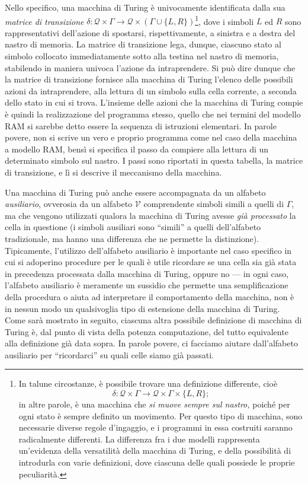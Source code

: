 \documentclass[10pt]{\classname}
\theoremstyle{definition}
\theoremstyle{definition}
\begin{document}
Nello specifico, una macchina di Turing è univocamente identificata dalla sua
\emph{matrice di transizione} $\delta  : \mathcal Q \times \Gamma \rightarrow
\mathcal Q \times (\Gamma \cup \{L,R\})$\footnote{In talune circostanze, è
possibile trovare una definizione differente, cioè $$\delta  : \mathcal Q \times
\Gamma \rightarrow \mathcal Q \times \Gamma \times \{L,R\};$$ in altre parole, è
una macchina che \emph{si muove sempre sul nastro,} poiché per ogni stato è
sempre definito un movimento. Per questo tipo di macchina, sono necessarie
diverse regole d'ingaggio, e i programmi in essa costruiti saranno radicalmente
differenti. La differenza fra i due modelli rappresenta un'evidenza della
versatilità della macchina di Turing, e della possibilità di introdurla con
varie definizioni, dove ciascuna delle quali possiede le proprie peculiarità.},
dove i simboli $L$ ed $R$ sono rappresentativi dell'azione di spostarsi,
rispettivamente, a sinistra e a destra del nastro di memoria. La matrice di
transizione lega, dunque, ciascuno stato al simbolo collocato immediatamente
sotto alla testina nel nastro di memoria, stabilendo in maniera univoca
l'azione da intraprendere. Si può dire dunque che la matrice di transizione
fornisce alla macchina di Turing l'elenco delle possibili azioni da
intraprendere, alla lettura di un simbolo sulla cella corrente, a seconda dello
stato in cui si trova. L'insieme delle azioni che la macchina di Turing compie
è quindi la realizzazione del programma stesso, quello che nei termini del
modello RAM si sarebbe detto essere la sequenza di istruzioni elementari. In
parole povere, non si scrive un vero e proprio programma come nel caso della
macchina a modello RAM, bensì si specifica il passo da compiere alla lettura di
un determinato simbolo sul nastro. I passi sono riportati in questa tabella, la
matrice di transizione, e lì si descrive il meccanismo della macchina.

Una macchina di Turing può anche essere accompagnata da un alfabeto
\emph{ausiliario}, ovverosia da un alfabeto $\mathcal V$ comprendente simboli
simili a quelli di $\Gamma$, ma che vengono utilizzati qualora la macchina di
Turing avesse \emph{già processato} la cella in questione (i simboli ausiliari
sono ``simili'' a quelli dell'alfabeto tradizionale, ma hanno una differenza
che ne permette la distinzione). Tipicamente, l'utilizzo dell'alfabeto
ausiliario è importante nel caso specifico in cui si adoperino procedure per le
quali è utile ricordare se una cella sia già stata in precedenza processata
dalla macchina di Turing, oppure no --- in ogni caso, l'alfabeto ausiliario è
meramente un sussidio che permette una semplificazione della procedura o aiuta
ad interpretare il comportamento della macchina, non è in nessun modo un
qualsivoglia tipo di estensione della macchina di Turing. Come sarà mostrato in
seguito, ciascuna altra possibile definizione di macchina di Turing è, dal
punto di vista della potenza computazione, del tutto equivalente alla
definizione già data sopra. In parole povere, ci facciamo aiutare dall'alfabeto
ausiliario per ``ricordarci'' su quali celle siamo già passati.
\end{document}
